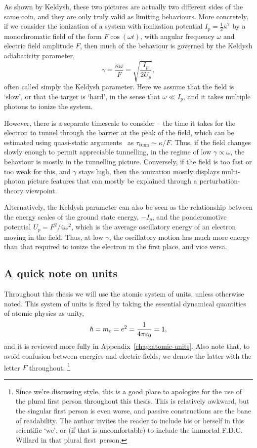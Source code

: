 As shown by Keldysh, these two pictures are actually two different sides of the same coin, and they are only truly valid  as limiting behaviours. More concretely, if we consider the ionization of a system with ionization potential $I_p=\frac12 \kappa^2$ by a monochromatic field of the form $F\cos(\omega t)$, with angular frequency $\omega$ and electric field amplitude $F$, then much of the behaviour is governed by the Keldysh adiabaticity parameter,
\begin{equation}
\gamma = \frac{\kappa \omega}{F} = \sqrt{\frac{I_p}{2U_p}},
\label{e1-keldysh-parameter}
\end{equation}
often called simply the Keldysh parameter. Here we assume that the field is `slow', or that the target is `hard', in the sense that $\omega\ll I_p$, and it takes multiple photons to ionize the system. 

However, there is a separate timescale to consider -- the time it takes for the electron to tunnel through the barrier at the peak of the field, which can be estimated using quasi-static arguments~\cite{landau_QM} as $\tau_\mathrm{tunn}\sim\kappa/F$. Thus, if the field changes slowly enough to permit appreciable tunnelling, in the regime of low $\gamma\propto\omega$, the behaviour is mostly in the tunnelling picture. Conversely, if the field is too fast or too weak for this, and $\gamma$ stays high, then the ionization mostly displays multi-photon picture features that can mostly be explained through a perturbation-theory viewpoint.

Alternatively, the Keldysh parameter can also be seen as the relationship between the energy scales of the ground state energy, $-I_p$, and the ponderomotive potential \mbox{$U_p=F^2/4\omega^2$}, which is the average oscillatory energy of an electron moving in the field. Thus, at low $\gamma$, the oscillatory motion has much more energy than that required to ionize the electron in the first place, and vice versa.




\subsection{A quick note on units}
Throughout this thesis we will use the atomic system of units, unless otherwise noted. This system of units is fixed by taking the essential dynamical quantities of atomic physics as unity,
\begin{equation}
\hbar = m_e = e^2 = \frac{1}{4\pi\varepsilon_0} = 1,
\end{equation}
and it is reviewed more fully in Appendix~\ref{chap:atomic-units}. Also note that, to avoid confusion between energies and electric fields, we denote the latter with the letter $F$ throughout.%
\footnote{%
Since we're discussing style, this is a good place to apologize for the use of the plural first person throughout this thesis. This is relatively awkward, but the singular first person is even worse, and passive constructions are the bane of readability. The author invites the reader to include his or herself in this scientific `we', or (if that is uncomfortable) to include the immortal F.D.C. Willard in that plural first~person.
}



